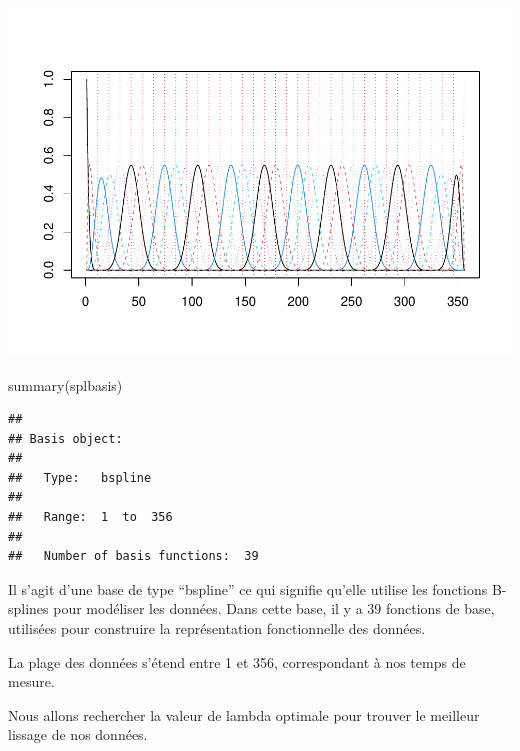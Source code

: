 \documentclass[
]{article}
\newenvironment{Shaded}{\begin{snugshade}}{\end{snugshade}}
\newcommand{\AttributeTok}[1]{\textcolor[rgb]{0.77,0.63,0.00}{#1}}
\newcommand{\CommentTok}[1]{\textcolor[rgb]{0.56,0.35,0.01}{\textit{#1}}}
\newcommand{\ControlFlowTok}[1]{\textcolor[rgb]{0.13,0.29,0.53}{\textbf{#1}}}
\newcommand{\DecValTok}[1]{\textcolor[rgb]{0.00,0.00,0.81}{#1}}
\newcommand{\FunctionTok}[1]{\textcolor[rgb]{0.00,0.00,0.00}{#1}}
\newcommand{\NormalTok}[1]{#1}
\newcommand{\OtherTok}[1]{\textcolor[rgb]{0.56,0.35,0.01}{#1}}
\newcommand{\SpecialCharTok}[1]{\textcolor[rgb]{0.00,0.00,0.00}{#1}}
\begin{document}
\includegraphics{Projet_CHESNAIS_GUIBERT_files/figure-latex/unnamed-chunk-22-1.pdf}

\begin{Shaded}
\begin{Highlighting}[]
\FunctionTok{summary}\NormalTok{(splbasis)}
\end{Highlighting}
\end{Shaded}

\begin{verbatim}
## 
## Basis object:
## 
##   Type:   bspline 
## 
##   Range:  1  to  356 
## 
##   Number of basis functions:  39
\end{verbatim}

Il s'agit d'une base de type ``bspline'' ce qui signifie qu'elle utilise
les fonctions B-splines pour modéliser les données. Dans cette base, il
y a 39 fonctions de base, utilisées pour construire la représentation
fonctionnelle des données.

La plage des données s'étend entre 1 et 356, correspondant à nos temps
de mesure.

Nous allons rechercher la valeur de lambda optimale pour trouver le
meilleur lissage de nos données.

\begin{Shaded}
\end{Shaded}
\end{document}
